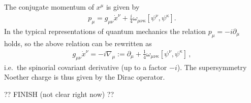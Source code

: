     The conjugate momentum of $x^\mu$ is given by
    \begin{gather}
        p_\mu = g_{\mu\nu}\dot{x}^\nu + \frac{i}{4}\omega_{\mu\nu\kappa}[\psi^\nu,\psi^\kappa].
    \end{gather}
    In the typical representations of quantum mechanics the relation $p_\mu = -i\partial_\mu$ holds, so the above relation can be rewritten as
    \begin{gather}
        g_{\mu\nu}\dot{x}^\nu = -i\nabla_\mu := \partial_\mu + \frac{1}{4}\omega_{\mu\nu\kappa}[\psi^\nu,\psi^\kappa]\,,
    \end{gather}
    i.e.~the spinorial covariant derivative (up to a factor $-i$). The supersymmetry Noether charge is thus given by the Dirac operator.

    ?? FINISH (not clear right now)  ??